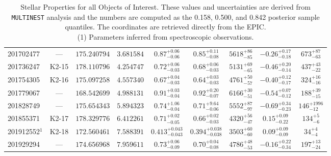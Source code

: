 \begin{landscape}
\begin{table}[hbt!]
\begin{center}
\begin{tabular}{lcccccccc}
 201702477 & ---       & $175.240794$ & $3.681584$ & $0.87^{+0.06}_{-0.06}$ & $0.85^{+0.11}_{-0.08}$ & $5618^{+  86}_{ -85}$ & $-0.26^{+0.17}_{-0.18}$ & $ 673^{+  87}_{ -63}$ \\ 
 201736247 & K2-15 & $178.110796$ & $4.254747$ & $0.72^{+0.06}_{-0.03}$ & $0.68^{+0.06}_{-0.03}$ & $5131^{+  69}_{ -65}$ & $-0.46^{+0.20}_{-0.14}$ & $ 437^{+  43}_{ -22}$ \\ 
 201754305 & K2-16 & $175.097258$ & $4.557340$ & $0.67^{+0.04}_{-0.03}$ & $0.64^{+0.03}_{-0.03}$ & $4761^{+  50}_{ -57}$ & $-0.40^{+0.12}_{-0.17}$ & $ 324^{+  16}_{ -16}$ \\ 
 201779067 & ---       & $168.542699$ & $4.988131$ & $0.91^{+0.03}_{-0.04}$ & $0.92^{+0.20}_{-0.07}$ & $6166^{+  30}_{ -51}$ & $-0.54^{+0.07}_{-0.12}$ & $ 188^{+  39}_{ -15}$ \\ 
 201828749 & ---       & $175.654343$ & $5.894323$ & $0.74^{+1.06}_{-0.04}$ & $0.71^{+9.64}_{-0.06}$ & $5552^{+  87}_{ -97}$ & $-0.69^{+0.34}_{-0.23}$ & $ 146^{+1996}_{ -12}$ \\ 
 201855371 & K2-17 & $178.329776$ & $6.412261$ & $0.71^{+0.02}_{-0.05}$ & $0.66^{+0.02}_{-0.03}$ & $4320^{+  56}_{ -47}$ & $0.15^{+0.09}_{-0.22}$ & $ 134^{+   5}_{  -6}$ \\ 
 201912552$^1$ & K2-18 & $172.560461$ & $7.588391$ & $0.413^{+0.043}_{-0.043}$ & $0.394^{+0.038}_{-0.038}$ & $3503^{+  60}_{ -60}$ & $0.09^{+0.09}_{-0.09}$ & $  34^{+   4}_{  -4}$ \\ 
 201929294 & ---       & $174.656968$ & $7.959611$ & $0.73^{+0.06}_{-0.09}$ & $0.70^{+0.04}_{-0.08}$ & $4786^{+  48}_{ -53}$ & $-0.16^{+0.22}_{-0.34}$ & $ 197^{+  13}_{ -24}$ \\ 
\hline
\end{tabular}
\caption[Stellar Properties for all Objects of Interest]{Stellar Properties for all Objects of Interest. 
These values and uncertainties are derived from \texttt{MULTINEST} analysis and the
numbers are computed as the 0.158, 0.500, and 0.842 posterior sample quantiles. 
The coordinates are retrieved directly from the EPIC. \\
(1) Parameters inferred from spectroscopic observations.}
\end{center}
\label{Tab:Stars}
\end{table}
\end{landscape}
\clearpage